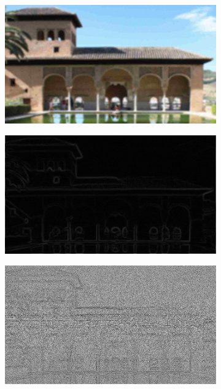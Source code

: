\begin{figure}
\begin{subfigure}[b]{0.3\textwidth}
         \caption{}
         \label{}
     \end{subfigure}
     \\
     \begin{subfigure}[b]{0.3\textwidth}
         \centering
         \includegraphics[width=\textwidth]{./figs/img225}
         \caption{}
         \label{}
     \end{subfigure}
     \hfill
     \begin{subfigure}[b]{0.3\textwidth}
         \centering
         \includegraphics[width=\textwidth]{./figs/gradientMap2}
         \caption{}
         \label{}
     \end{subfigure}
     \hfill
     \begin{subfigure}[b]{0.3\textwidth}
         \centering
         \includegraphics[width=\textwidth]{./figs/lbp_gradient2}

\end{subfigure}
\end{figure}

